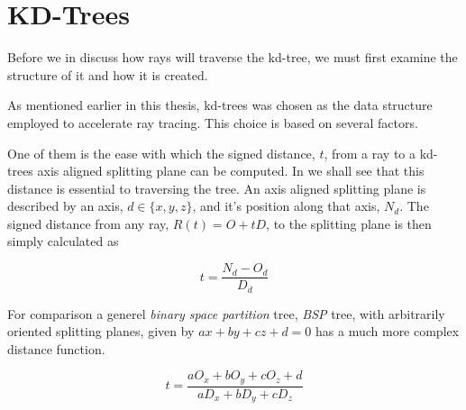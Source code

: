 \chapter{KD-Trees}\label{chp:kdTrees}





Before we in  discuss how rays will
traverse the kd-tree, we must first examine the structure of it and
how it is created.


As mentioned earlier in this thesis, kd-trees was chosen as the data
structure employed to accelerate ray tracing. This choice is based on
several factors.


One of them is the ease with which the signed distance, $t$, from a
ray to a kd-trees axis aligned splitting plane can be computed. In
 we shall see that this distance
is essential to traversing the tree. An axis aligned splitting plane
is described by an axis, $d \in \{x, y, z\}$, and it's position along
that axis, $N_d$. The signed distance from any ray, $R(t) = O + tD$,
to the splitting plane is then simply calculated as

\begin{displaymath}
  t = \frac{N_d - O_d}{D_d}
\end{displaymath}

For comparison a generel \textit{binary space partition} tree,
\textit{BSP} tree, with arbitrarily oriented splitting planes, given
by $ax + by + cz + d = 0$ has a much more complex distance function.

\begin{displaymath}
  t = \frac{a O_x + b O_y + c O_z + d}{a D_x + b D_y + c D_z}
\end{displaymath}


